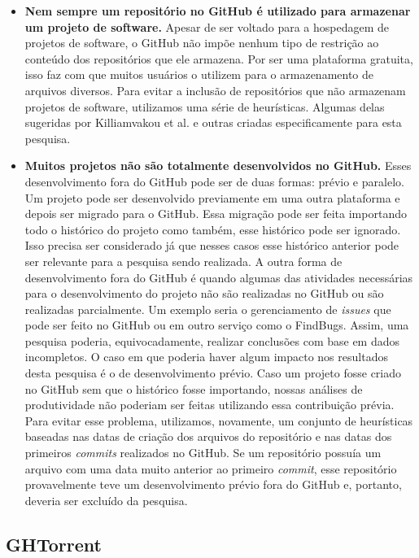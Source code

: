 \begin{itemize}
\item \textbf{Nem sempre um repositório no GitHub é utilizado para armazenar um projeto de software.} Apesar de ser voltado para a hospedagem de projetos de software, o GitHub não impõe nenhum tipo de restrição ao conteúdo dos repositórios que ele armazena. Por ser uma plataforma gratuita, isso faz com que muitos usuários o utilizem para o armazenamento de arquivos diversos. Para evitar a inclusão de repositórios que não armazenam projetos de software, utilizamos uma série de heurísticas. Algumas delas sugeridas por Killiamvakou et al.\cite{kalliamvakou2014promises} e outras criadas especificamente para esta pesquisa. 
\item \textbf{Muitos projetos não são totalmente desenvolvidos no GitHub.} Esses desenvolvimento fora do GitHub pode ser de duas formas: prévio e paralelo. Um projeto pode ser desenvolvido previamente em uma outra plataforma e depois ser migrado para o GitHub. Essa migração pode ser feita importando todo o histórico do projeto como também, esse histórico pode ser ignorado. Isso precisa ser considerado já que nesses casos esse histórico anterior pode ser relevante para a pesquisa sendo realizada.  A outra forma de desenvolvimento fora do GitHub é quando algumas das atividades necessárias para o desenvolvimento do projeto não são realizadas no GitHub ou são realizadas parcialmente. Um exemplo seria o gerenciamento de \textit{issues} que pode ser feito no GitHub ou em outro serviço como o FindBugs\cite{ayewah2007using}. Assim, uma pesquisa poderia, equivocadamente, realizar conclusões com base em dados incompletos. O caso em que poderia haver algum impacto nos resultados desta pesquisa é o de desenvolvimento prévio. Caso um projeto fosse criado no GitHub sem que o histórico fosse importando, nossas análises de produtividade não poderiam ser feitas utilizando essa contribuição prévia. Para evitar esse problema, utilizamos, novamente, um conjunto de heurísticas baseadas nas datas de criação dos arquivos do repositório e nas datas dos primeiros \textit{commits} realizados no GitHub. Se um repositório possuía um arquivo com uma data muito anterior ao primeiro \textit{commit}, esse repositório provavelmente teve um desenvolvimento prévio fora do GitHub e, portanto, deveria ser excluído da pesquisa.
\end{itemize}



\subsection{GHTorrent}

